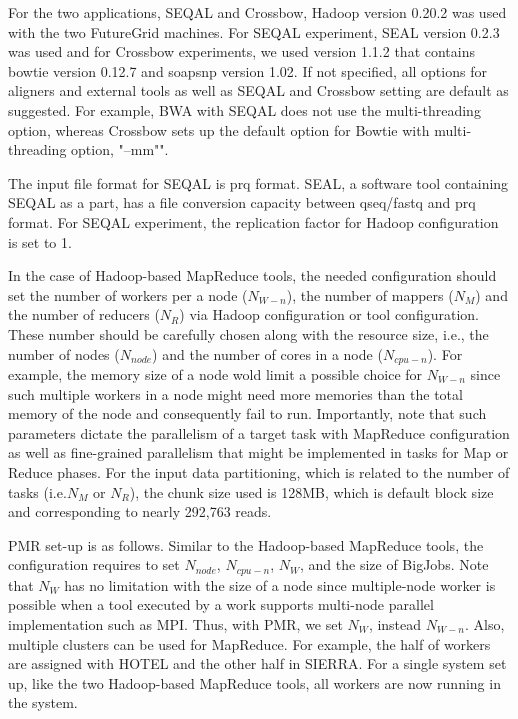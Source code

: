 \documentclass{sig-alternate}
\begin{document}
For the two applications, SEQAL and Crossbow, Hadoop version 0.20.2 was used with the two FutureGrid machines.  For SEQAL experiment, SEAL version 0.2.3 was used and for Crossbow experiments, we used version 1.1.2 that contains bowtie version 0.12.7 and soapsnp version 1.02.  If not specified, all options for aligners and external tools as well as SEQAL and Crossbow setting are default as suggested.  For example, BWA with SEQAL does not use the multi-threading option, whereas Crossbow sets up the default option for Bowtie with multi-threading option, "--mm"".

The input file format for SEQAL is prq format.  SEAL, a software tool containing SEQAL as a part, has a file conversion capacity between qseq/fastq and prq format.  For SEQAL experiment, the replication factor for Hadoop configuration is set  to 1.  

In the case of Hadoop-based MapReduce tools, the needed configuration should set the number of workers per a node ($N_{W-n}$), the number of mappers ($N_M$) and the number of reducers ($N_R$) via Hadoop configuration or tool configuration.  These number should be carefully chosen along with the resource size, i.e., the number of nodes ($N_{node}$) and the number of cores in a node ($N_{cpu-n}$).  For example, the memory size of a node wold limit a possible choice for $N_{W-n}$ since such multiple workers in a node might need more memories than the total memory of the node and consequently fail to run.  Importantly, note that such parameters dictate the parallelism of a target task with MapReduce configuration as well as fine-grained parallelism that might be implemented in tasks for Map or Reduce phases.  For the input data partitioning, which is related to the number of tasks (i.e.$N_M$ or $N_R$), the chunk size used is 128MB, which is default block size and corresponding to nearly 292,763 reads. 
%

PMR set-up is as follows.  Similar to the Hadoop-based MapReduce tools, the configuration requires to set $N_{node}$, $N_{cpu-n}$, $N_W$, and the size of BigJobs.  Note that $N_W$ has no limitation with the size of a node since multiple-node worker is possible when a tool executed by a work supports multi-node parallel implementation such as MPI.  Thus, with PMR, we set $N_W$, instead $N_{W-n}$.  Also, multiple clusters can be used for MapReduce. For example, the half of workers are assigned with HOTEL and the other half in SIERRA.  For a single system set up, like the two Hadoop-based MapReduce tools, all workers are now running in the system.  
\end{document}
